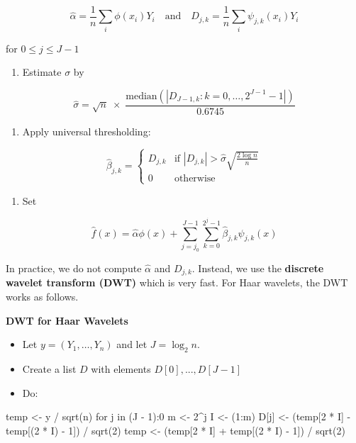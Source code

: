 \[ \hat{\alpha} = \frac{1}{n} \sum_i \phi(x_i) Y_i
\quad \text{and} \quad
D_{j, k} = \frac{1}{n} \sum_i \psi_{j, k}(x_i) Y_i
\]

for \(0 \leq j \leq J - 1\)

\begin{enumerate}[tightlist,label={\arabic*.}]
\item
  Estimate \(\sigma\) by
\end{enumerate}

\[ \hat{\sigma} = \sqrt{n} \; \times \; \frac{\text{median} \left( \left| D_{J-1, k} : k = 0, \dots, 2^{J - 1} - 1\right| \right)}{0.6745} \]

\begin{enumerate}[tightlist,label={\arabic*.},resume]
\item
  Apply universal thresholding:
\end{enumerate}

\[ \hat{\beta}_{j, k} = \begin{cases}
D_{j, k} & \text{if } \left| D_{j, k} \right| > \hat{\sigma} \sqrt{\frac{2 \log n}{n}} \\
0 & \text{otherwise}
\end{cases}\]

\begin{enumerate}[tightlist,label={\arabic*.},resume]
\item
  Set
\end{enumerate}

\[ \hat{f}(x) = \hat{\alpha} \phi(x) + \sum_{j = j_0}^{J - 1} \sum_{k = 0}^{2^j - 1} \hat{\beta}_{j, k} \psi_{j, k}(x) \]

In practice, we do not compute \(\hat{\alpha}\) and \(D_{j, k}\).
Instead, we use the \textbf{discrete wavelet transform (DWT)} which is
very fast. For Haar wavelets, the DWT works as follows.

\textbf{DWT for Haar Wavelets}

\begin{itemize}[tightlist]
\item
  Let \(y = (Y_1, \dots, Y_n)\) and let \(J = \log_2 n\).\\
\item
  Create a list \(D\) with elements \(D[0], ..., D[J - 1]\)
\item
  Do:
\end{itemize}

\begin{console}
temp <- y / sqrt(n)
for j in (J - 1):0 {
  m <- 2^j
  I <- (1:m)
  D[j] <- (temp[2 * I] - temp[(2 * I) - 1]) / sqrt(2)
  temp <- (temp[2 * I] + temp[(2 * I) - 1]) / sqrt(2)
}
\end{console}

